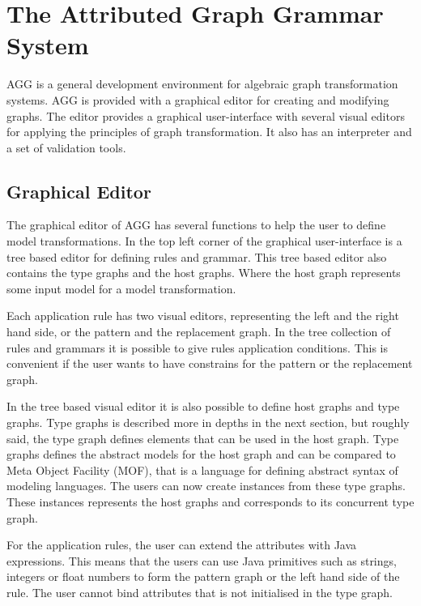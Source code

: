 \documentclass[pdftex,11pt,a4paper]{article}
\begin{document}
\section{The Attributed Graph Grammar System}

\noindent AGG is a general development environment for algebraic graph
transformation systems. AGG is provided with a graphical editor for creating
and modifying graphs. The editor provides a graphical user-interface with
several visual editors for applying the principles of graph transformation. It
also has an interpreter and a set of validation tools.

\subsection{Graphical Editor}
\noindent The graphical editor of AGG has several functions to help the user to
define model transformations. In the top left corner of the graphical user-interface is
a tree based editor for defining rules and grammar. This tree based editor also
contains the type graphs and the host graphs. Where the host graph represents
some input model for a model transformation.

\indent Each application rule has two visual editors, representing the left and
the right hand side, or the pattern and the replacement graph. In the tree
collection of rules and grammars it is possible to give rules application
conditions. This is convenient if the user wants to have constrains for the
pattern or the replacement graph. 

\indent In the tree based visual editor it is also possible to define host
graphs and type graphs. Type graphs is described more in depths in the next
section, but roughly said, the type graph defines elements that can be used in
the host graph. Type graphs defines the abstract models for the host graph and
can be compared to Meta Object Facility (MOF)\cite{MOF}, that is a language for
defining abstract syntax of modeling languages. The users can now create instances
from these type graphs. These instances represents the host graphs and
corresponds to its concurrent type graph. 

\indent For the application rules, the user can extend the attributes with Java
expressions. This means that the users can use Java primitives such as strings,
integers or float numbers to form the pattern graph or the left hand side of the
rule. The user cannot bind attributes that is not initialised in the type graph. 
\end{document}
